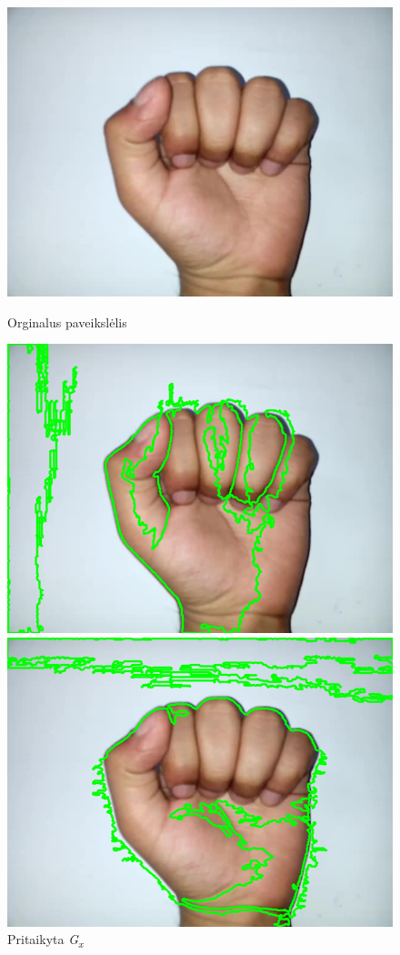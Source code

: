 \documentclass{VUMIFInfKursinis}
\begin{document}
\begin{figure}[H]
	\begin{minipage}{.3\textwidth}
		\centering
		\includegraphics[width=.8\linewidth]{img/A}
		\caption{Orginalus paveikslėlis}
		\label{img:a-sign}
	\end{minipage}\hspace{\fill}%
	\begin{minipage}{.3\textwidth}
		\centering
		\includegraphics[width=.8\linewidth]{img/A-sobelX}
		\caption{Pritaikyta \textit{G\textsubscript{x}}}
		\label{img:a-sobelX}
	\end{minipage}\hspace{\fill}%
	\begin{minipage}{.3\textwidth}
		\centering
		\includegraphics[width=.8\linewidth]{img/A-sobelY}

\end{minipage}
\end{figure}
\end{document}
